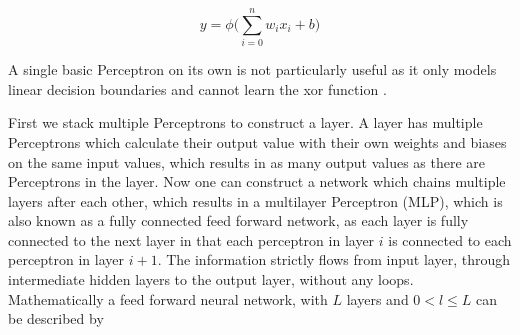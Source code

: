 \documentclass[twoside,a4paper,10pt,DIV=12,BCOR=12mm]{scrartcl}
\newcommand{\addaxes}{\draw (0em,1em) -- (0em,-1em)
                            (-1em,0em) -- (1em,0em);}
\newcommand{\relu}{\draw[line width=1.5pt] (-1em,0) -- (0,0)
                                (0,0) -- (0.75em,0.75em);}
\newcommand{\stepfunc}{\draw[line width=1.5pt] (0.65em,0.65em) -- (0,0.65em) 
                                    -- (0,-0.65em) -- (-0.65em,-0.65em);}
\begin{document}
$$
y=\phi\bigl(\sum_{i=0}^{n}w_i x_i + b\bigr)
$$


\begin{center}


\end{center}

A single basic Perceptron on its own is not particularly useful as
it only models linear decision boundaries and cannot learn the xor function \cite{MinskyPapert69}.

First we stack multiple Perceptrons to construct a layer. A layer has multiple
Perceptrons which calculate their output value with their own weights and biases on the same input values, which results
in as many output values as there are Perceptrons in the layer. Now one can construct a network which chains
multiple layers after each other, which results in a multilayer Perceptron (MLP), which is also known as a fully connected
feed forward network, as each layer is fully connected to the next layer in that each perceptron in layer $i$ 
is connected to each perceptron in layer $i+1$. The information strictly flows from input layer, through
intermediate hidden layers to the output layer, without any loops.
Mathematically a feed forward neural network, with $L$ layers and $0 < l \leq L$ can be described by
\end{document}
